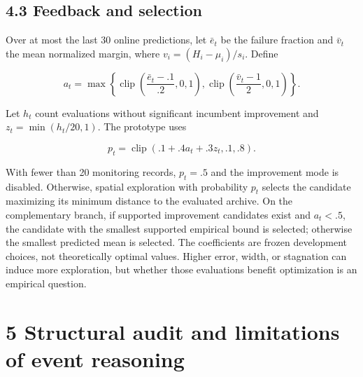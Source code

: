 \documentclass[11pt,a4paper]{article}
\begin{document}
\par{}\noindent\begin{minipage}{\linewidth}

\hypertarget{feedback-and-selection}{%
\subsection{4.3 Feedback and selection}\label{feedback-and-selection}}

Over at most the last 30 online predictions, let \(\bar e_t\) be the
failure fraction and \(\bar v_t\) the mean normalized margin, where
\(v_i=(H_i-\mu_i)/s_i\). Define

\[a_t=\max\left\{\operatorname{clip}\left(\frac{\bar e_t-.1}{.2},0,1\right),\operatorname{clip}\left(\frac{\bar v_t-1}{2},0,1\right)\right\}.\]

\end{minipage}\par

\par\noindent\begin{minipage}{\linewidth}

Let \(h_t\) count evaluations without significant incumbent improvement
and \(z_t=\min(h_t/20,1)\). The prototype uses

\[p_t=\operatorname{clip}(.1+.4a_t+.3z_t,.1,.8).\]

\end{minipage}\par

With fewer than 20 monitoring records, \(p_t=.5\) and the improvement
mode is disabled. Otherwise, spatial exploration with probability
\(p_t\) selects the candidate maximizing its minimum distance to the
evaluated archive. On the complementary branch, if supported improvement
candidates exist and \(a_t<.5\), the candidate with the smallest
supported empirical bound is selected; otherwise the smallest predicted
mean is selected. The coefficients are frozen development choices, not
theoretically optimal values. Higher error, width, or stagnation can
induce more exploration, but whether those evaluations benefit
optimization is an empirical question.

\hypertarget{structural-audit-and-limitations-of-event-reasoning}{%
\section{5 Structural audit and limitations of event
reasoning}\label{structural-audit-and-limitations-of-event-reasoning}}
\end{document}
